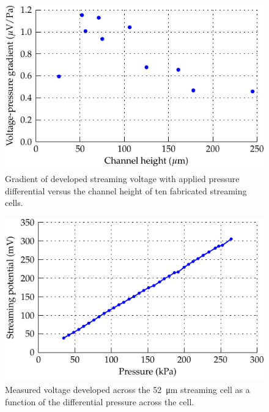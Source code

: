 \documentclass[10pt,final,journal]{IEEEtran}
\begin{document}
    \begin{figure}
        \begin{center}
        \includegraphics[width=\linewidth]{graph_cellEfficiency}
        \end{center}
        \caption{Gradient of developed streaming voltage with applied pressure differential versus the channel height of ten fabricated streaming cells.}
        \label{fig:cellEfficiency}
    \end{figure}

    \begin{figure}
        \begin{center}
        \includegraphics[width=\linewidth]{graph_voltagePressure}
        \end{center}
        \caption{Measured voltage developed across the \SI{52}{\micro\meter} streaming cell as a function of the differential pressure across the cell.}
        \label{fig:cellVoltagePressure}
    \end{figure}
\end{document}
